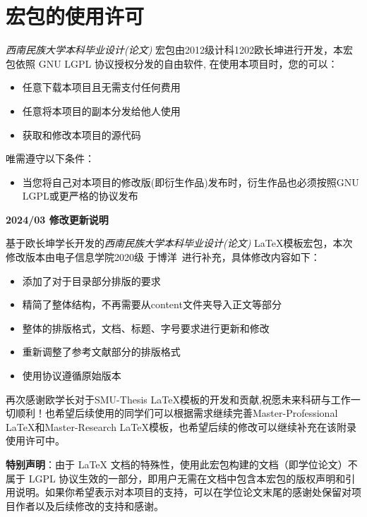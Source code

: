 \appendix
  \chapter{宏包的使用许可}
  \label{appendix:a}
  \date{2024/03}
  \emph{西南民族大学本科毕业设计(论文)} 宏包由2012级计科1202欧长坤进行开发，本宏包依照 GNU LGPL 协议授权分发的自由软件, 在使用本项目时，您的可以：

\begin{itemize}
    \item 任意下载本项目且无需支付任何费用
    \item 任意将本项目的副本分发给他人使用
    \item 获取和修改本项目的源代码
\end{itemize}

  唯需遵守以下条件：

  \begin{itemize}
      \item 当您将自己对本项目的修改版(即衍生作品)发布时，衍生作品也必须按照GNU LGPL或更严格的协议发布
  \end{itemize}

	\textbf{2024/03 修改更新说明}
	
	基于欧长坤学长开发的\emph{西南民族大学本科毕业设计(论文)} \LaTeX 模板宏包，本次修改版本由电子信息学院2020级 于博洋~进行补充，具体修改内容如下：
	\begin{itemize}
		\item 添加了对于目录部分排版的要求
		\item 精简了整体结构，不再需要从content文件夹导入正文等部分
		\item 整体的排版格式，文档、标题、字号要求进行更新和修改
		\item 重新调整了参考文献部分的排版格式
		\item 使用协议遵循原始版本
	\end{itemize}
	再次感谢欧学长对于SMU-Thesis \LaTeX 模板的开发和贡献,祝愿未来科研与工作一切顺利！也希望后续使用的同学们可以根据需求继续完善Master-Professional \LaTeX 和Master-Research \LaTeX 模板，也希望后续的修改可以继续补充在该附录使用许可中。
	
  \textbf{特别声明}：由于 LaTeX 文档的特殊性，使用此宏包构建的文档（即学位论文）不属于 LGPL 协议生效的一部分，即用户无需在文档中包含本宏包的版权声明和引用说明。如果你希望表示对本项目的支持，可以在学位论文末尾的感谢处保留对项目作者以及后续修改的支持和感谢。

  \cleardoublepage
